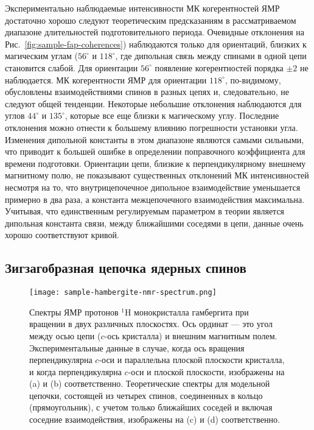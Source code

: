 Экспериментально наблюдаемые интенсивности МК когерентностей ЯМР достаточно хорошо следуют теоретическим предсказаниям
в рассматриваемом диапазоне длительностей подготовительного периода.
Очевидные отклонения на Рис.~\ref{fig:sample-fap-coherences}) наблюдаются только для ориентаций,
близких к магическим углам ($56^\circ$ и $118^\circ$,
где дипольная связь между спинами в одной цепи становится слабой.
Для ориентации $56^\circ$ появление когерентностей порядка $\pm2$ не наблюдается.
МК когерентности  ЯМР для ориентации $118^\circ$,
по-видимому, обусловлены взаимодействиями спинов в разных цепях и, следовательно, не следуют общей тенденции.
Некоторые небольшие отклонения наблюдаются для углов $44^\circ$ и $135^\circ$,
которые все еще близки к магическому углу.
Последние отклонения можно отнести к большему влиянию погрешности установки угла.
Изменения дипольной константы в этом диапазоне являются самыми сильными,
что приводит к большей ошибке в определении поправочного коэффициента для времени подготовки.
Ориентации цепи, близкие к перпендикулярному внешнему магнитному полю,
не показывают существенных отклонений МК интенсивностей несмотря на то,
что внутрицепочечное дипольное взаимодействие уменьшается примерно в два раза,
а константа межцепочечного взаимодействия максимальна.
Учитывая, что единственным регулируемым параметром в теории является дипольная константа связи,
между ближайшими соседями в цепи, данные очень хорошо соответствуют кривой.




\subsection{Зигзагобразная цепочка ядерных спинов}

\begin{figure}
  \centering
  \texttt{[image: sample-hambergite-nmr-spectrum.png]}
  \caption{
    Спектры ЯМР протонов $^1$H монокристалла гамбергита при вращении в двух различных плоскостях.
    Ось ординат --- это угол между осью цепи ($c$-ось кристалла) и внешним магнитным полем.
    Экспериментальные данные в случае, когда
    ось вращения перпендикулярна $c$-оси и параллельна плоской плоскости кристалла,
    и когда перпендикулярна $c$-оси и плоской плоскости,
    изображены на (a) и (b) соответственно.
    Теоретические спектры для модельной цепочки,
    состоящей из четырех спинов, соединенных в кольцо (прямоугольник),
    с учетом только ближайших соседей и включая соседние взаимодействия,
    изображены на (c) и (d) соответственно.
  }
  \label{fig:sample-hambergite-nmr-spectrum}
\end{figure}

